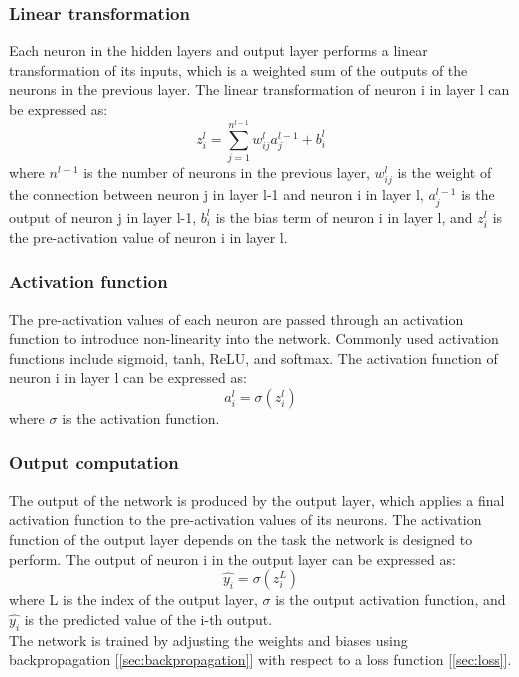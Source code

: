 \documentclass[a4paper, noexaminfo]{sapthesis}
\begin{document}
\subsubsection{Linear transformation}
Each neuron in the hidden layers and output layer
 performs a linear transformation of its inputs, which is a weighted sum 
 of the outputs of the neurons in the previous layer. The linear 
 transformation of neuron i in layer l can be expressed as:
 \begin{equation}
  \label{eq:linear_transformation}
z_i^l = \sum_{j=1}^{n^{l-1}} w_{ij}^l a_j^{l-1} + b_i^l
\end{equation}
where $n^{l-1}$ is the number of neurons in the previous layer,
 $w_{ij}^l$ is the weight of the connection between neuron j in layer 
 l-1 and neuron i in layer l, $a_j^{l-1}$ is the output of neuron j 
 in layer l-1, $b_i^l$ is the bias term of neuron i in layer l, and
  $z_i^l$ is the pre-activation value of neuron i in layer l.
  \subsubsection{Activation function}
The pre-activation values of each neuron are 
passed through an activation function to introduce non-linearity
 into the network. Commonly used activation functions include sigmoid,
  tanh, ReLU, and softmax. The activation function of neuron i in layer
l can be expressed as:
\begin{equation}
\label{eq:activation_function}
a_i^l = \sigma(z_i^l)
\end{equation}
where $\sigma$ is the activation function.
\subsubsection{Output computation}
 The output of the network is produced by the output
 layer, which applies a final activation function to the pre-activation
  values of its neurons. The activation function of the output layer 
  depends on the task the network is designed to perform. The output of neuron i in the output layer can be expressed as:
\begin{equation}
\label{eq:output}
  \hat{y_i} = \sigma(z_i^L)
\end{equation}
where L is the index of the output layer, $\sigma$ is the output activation
 function, and $\hat{y_i}$ is the predicted value of the i-th output.\newline \\
The network is trained by adjusting the weights and biases using
backpropagation [\ref{sec:backpropagation}] with respect to a loss function
 [\ref{sec:loss}].
\end{document}
